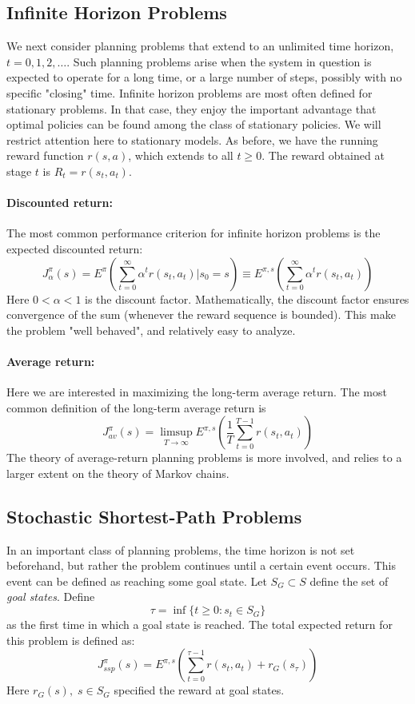 \subsection{Infinite Horizon Problems}
We next consider planning problems that extend to an unlimited time horizon, $t = 0,1,2, \ldots $. Such planning problems arise when the system in question is expected to operate for a long time, or a large number of steps, possibly with no specific "closing" time.
Infinite horizon problems are most often defined for stationary problems. In that case, they enjoy the important advantage that optimal policies can be found among the class of stationary policies.  We will restrict attention here to stationary models.
As before, we have the running reward function $r(s,a)$, which extends to all $t \ge 0$. The reward obtained at stage $t$ is  ${R_t} = r({s_t},{a_t})$.

\paragraph{Discounted return:} The most common performance criterion for infinite horizon problems is the expected discounted return:
\[J_\alpha ^\pi (s) = {E^\pi }\left(\sum\limits_{t = 0}^\infty  {{\alpha ^t}r({s_t},{a_t})} |{s_0} = s\right) \equiv {E^{\pi ,s}}\left(\sum\limits_{t = 0}^\infty  {{\alpha ^t}r({s_t},{a_t})} \right)\]
Here $0 < \alpha  < 1$ is the discount factor. Mathematically, the discount factor ensures convergence of the sum (whenever the reward sequence is bounded). This make the problem "well behaved", and relatively easy to analyze.
\paragraph{Average return:}  Here we are interested in maximizing the long-term average return. The most common definition of the long-term average return is
\[J_{av}^\pi (s) = \mathop {\lim \sup }\limits_{T \to \infty } {E^{\pi ,s}}\left(\frac{1}{T}\sum\limits_{t = 0}^{T - 1} {r({s_t},{a_t})} \right)\]
The theory of average-return planning problems is more involved, and relies to a larger extent on the theory of Markov chains.


\subsection{Stochastic Shortest-Path Problems}
In an important class of planning problems, the time horizon is not set beforehand, but rather the problem continues until a certain event occurs. This event can be defined as reaching some goal state.
Let  ${S_G} \subset S$ define the set of \emph{goal states}. Define
\[\tau  = \inf \{ t \ge 0:{s_t} \in {S_G}\} \]
as the first time in which a goal state is reached. The total expected return for this problem is defined as:
\[J_{ssp}^\pi (s) = {E^{\pi ,s}}\left(\sum\limits_{t = 0}^{\tau  - 1} {r({s_t},{a_t})}  + {r_G}({s_\tau })\right)\]
Here ${r_G}(s),\;s \in {S_G}$ specified the reward at goal states.

